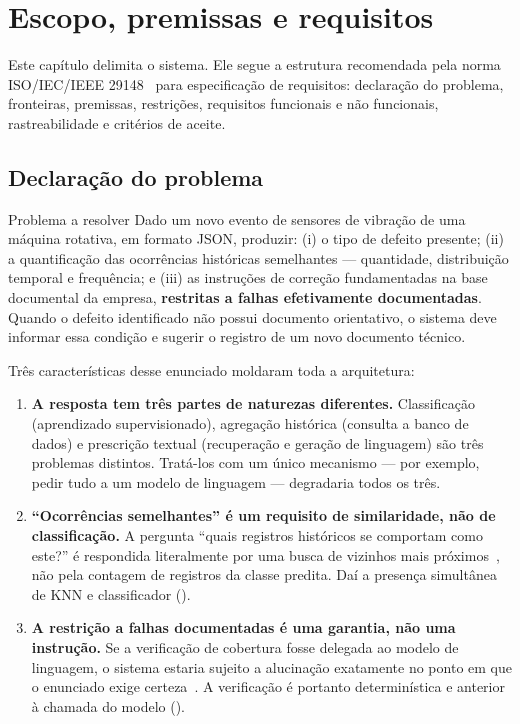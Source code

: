 \chapter{Escopo, premissas e requisitos}
\label{cap:escopo}

Este capítulo delimita o sistema. Ele segue a estrutura recomendada pela norma
ISO/IEC/IEEE 29148~\cite{iso29148} para especificação de requisitos: declaração
do problema, fronteiras, premissas, restrições, requisitos funcionais e não
funcionais, rastreabilidade e critérios de aceite.

\section{Declaração do problema}

\begin{especificacao}{Problema a resolver}
Dado um novo evento de sensores de vibração de uma máquina rotativa, em formato
JSON, produzir: (i) o tipo de defeito presente; (ii) a quantificação das
ocorrências históricas semelhantes --- quantidade, distribuição temporal e
frequência; e (iii) as instruções de correção fundamentadas na base documental
da empresa, \textbf{restritas a falhas efetivamente documentadas}. Quando o
defeito identificado não possui documento orientativo, o sistema deve informar
essa condição e sugerir o registro de um novo documento técnico.
\end{especificacao}

Três características desse enunciado moldaram toda a arquitetura:

\begin{enumerate}
  \item \textbf{A resposta tem três partes de naturezas diferentes.}
    Classificação (aprendizado supervisionado), agregação histórica (consulta a
    banco de dados) e prescrição textual (recuperação e geração de linguagem)
    são três problemas distintos. Tratá-los com um único mecanismo --- por
    exemplo, pedir tudo a um modelo de linguagem --- degradaria todos os três.

  \item \textbf{\enquote{Ocorrências semelhantes} é um requisito de
    similaridade, não de classificação.} A pergunta \enquote{quais registros
    históricos se comportam como este?} é respondida literalmente por uma busca
    de vizinhos mais próximos~\cite{cover1967nearest}, não pela contagem de
    registros da classe predita. Daí a presença simultânea de KNN e
    classificador ().

  \item \textbf{A restrição a falhas documentadas é uma garantia, não uma
    instrução.} Se a verificação de cobertura fosse delegada ao modelo de
    linguagem, o sistema estaria sujeito a alucinação exatamente no ponto em que
    o enunciado exige certeza~\cite{ji2023hallucination}. A verificação é
    portanto determinística e anterior à chamada do modelo ().
\end{enumerate}

